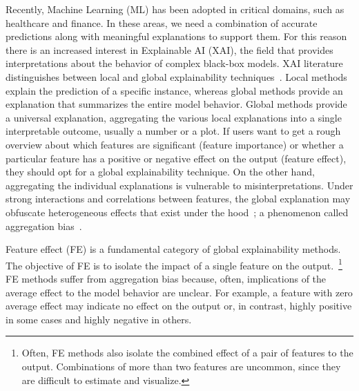\documentclass[twoside]{article}
\begin{document}
Recently, Machine Learning (ML) has been adopted in critical domains,
such as healthcare and finance. In these areas, we need a combination
of accurate predictions along with meaningful explanations to support
them. For this reason there is an increased interest in Explainable AI
(XAI), the field that provides interpretations about the behavior of
complex black-box models. XAI literature distinguishes between local
and global explainability
techniques~\citep{Molnar2020interpretable}. Local methods explain the prediction of a
specific instance, whereas global methods provide an explanation that summarizes the entire model behavior. Global methods provide a universal explanation, aggregating the various local explanations into a single interpretable outcome,
usually a number or a plot. If users want to get a rough overview
about which features are significant (feature importance) or whether a
particular feature has a positive or negative effect on the output
(feature effect), they should opt for a global explainability
technique. On the other hand, aggregating the individual explanations
is vulnerable to misinterpretations. Under strong interactions and
correlations between features, the global explanation may obfuscate
heterogeneous effects that exist under the
hood~\citep{herbinger2022repid}; a phenomenon called aggregation
bias~\citep{mehrabi2021survey}.

Feature effect (FE) \citep{Gromping2020MAEP} is a fundamental category of global
explainability methods. The objective of FE is to isolate the impact
of a single feature on the output.~\footnote{Often, FE methods also
  isolate the combined effect of a pair of features to the
  output. Combinations of more than two features are uncommon, since they are difficult to estimate and visualize.}
FE methods suffer from aggregation bias because, often, implications of the average effect to the model behavior are unclear. For example, a feature with zero
average effect may indicate no effect on the output or, in contrast,
highly positive in some cases and highly negative in others. 
\end{document}
